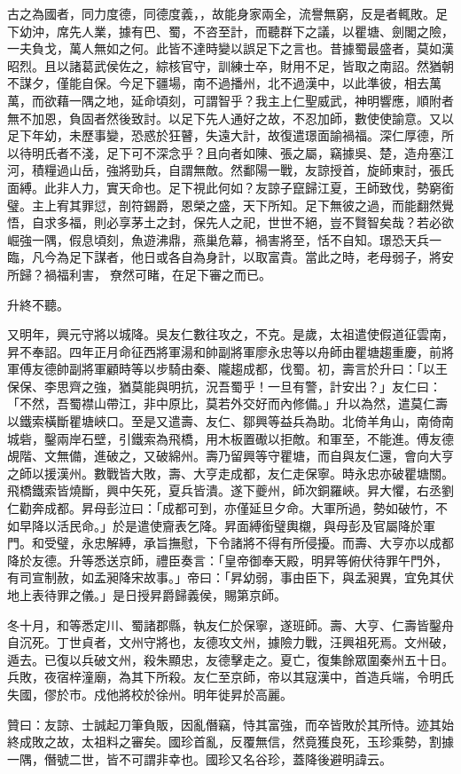 古之為國者，同力度德，同德度義，，故能身家兩全，流譽無窮，反是者輒敗。足下幼沖，席先人業，據有巴、蜀，不咨至計，而聽群下之議，以瞿塘、劍閣之險，一夫負戈，萬人無如之何。此皆不達時變以誤足下之言也。昔據蜀最盛者，莫如漢昭烈。且以諸葛武侯佐之，綜核官守，訓練士卒，財用不足，皆取之南詔。然猶朝不謀夕，僅能自保。今足下疆場，南不過播州，北不過漢中，以此準彼，相去萬萬，而欲藉一隅之地，延命頃刻，可謂智乎？我主上仁聖威武，神明響應，順附者無不加恩，負固者然後致討。以足下先人通好之故，不忍加師，數使使諭意。又以足下年幼，未歷事變，恐惑於狂瞽，失遠大計，故復遣璟面諭禍福。深仁厚德，所以待明氏者不淺，足下可不深念乎？且向者如陳、張之屬，竊據吳、楚，造舟塞江河，積糧過山岳，強將勁兵，自謂無敵。然鄱陽一戰，友諒授首，旋師東討，張氏面縛。此非人力，實天命也。足下視此何如？友諒子竄歸江夏，王師致伐，勢窮銜璧。主上宥其罪愆，剖符錫爵，恩榮之盛，天下所知。足下無彼之過，而能翻然覺悟，自求多福，則必享茅土之封，保先人之祀，世世不絕，豈不賢智矣哉？若必欲崛強一隅，假息頃刻，魚遊沸鼎，燕巢危幕，禍害將至，恬不自知。璟恐天兵一臨，凡今為足下謀者，他日或各自為身計，以取富貴。當此之時，老母弱子，將安所歸？禍福利害，尞然可睹，在足下審之而已。

升終不聽。

又明年，興元守將以城降。吳友仁數往攻之，不克。是歲，太祖遣使假道征雲南，昇不奉詔。四年正月命征西將軍湯和帥副將軍廖永忠等以舟師由瞿塘趨重慶，前將軍傅友德帥副將軍顧時等以步騎由秦、隴趨成都，伐蜀。初，壽言於升曰：「以王保保、李思齊之強，猶莫能與明抗，況吾蜀乎！一旦有警，計安出？」友仁曰：「不然，吾蜀襟山帶江，非中原比，莫若外交好而內修備。」升以為然，遣莫仁壽以鐵索橫斷瞿塘峽口。至是又遣壽、友仁、鄒興等益兵為助。北倚羊角山，南倚南城砦，鑿兩岸石壁，引鐵索為飛橋，用木板置礮以拒敵。和軍至，不能進。傅友德覘階、文無備，進破之，又破綿州。壽乃留興等守瞿塘，而自與友仁還，會向大亨之師以援漢州。數戰皆大敗，壽、大亨走成都，友仁走保寧。時永忠亦破瞿塘關。飛橋鐵索皆燒斷，興中矢死，夏兵皆潰。遂下夔州，師次銅羅峽。昇大懼，右丞劉仁勸奔成都。昇母彭泣曰：「成都可到，亦僅延旦夕命。大軍所過，勢如破竹，不如早降以活民命。」於是遣使齎表乞降。昇面縛銜璧輿櫬，與母彭及官屬降於軍門。和受璧，永忠解縛，承旨撫慰，下令諸將不得有所侵擾。而壽、大亨亦以成都降於友德。升等悉送京師，禮臣奏言：「皇帝御奉天殿，明昇等俯伏待罪午門外，有司宣制赦，如孟昶降宋故事。」帝曰：「昇幼弱，事由臣下，與孟昶異，宜免其伏地上表待罪之儀。」是日授昇爵歸義侯，賜第京師。

冬十月，和等悉定川、蜀諸郡縣，執友仁於保寧，遂班師。壽、大亨、仁壽皆鑿舟自沉死。丁世貞者，文州守將也，友德攻文州，據險力戰，汪興祖死焉。文州破，遁去。已復以兵破文州，殺朱顯忠，友德擊走之。夏亡，復集餘眾圍秦州五十日。兵敗，夜宿梓潼廟，為其下所殺。友仁至京師，帝以其寇漢中，首造兵端，令明氏失國，僇於市。戍他將校於徐州。明年徙昇於高麗。

贊曰：友諒、士誠起刀筆負販，因亂僭竊，恃其富強，而卒皆敗於其所恃。迹其始終成敗之故，太祖料之審矣。國珍首亂，反覆無信，然竟獲良死，玉珍乘勢，割據一隅，僭號二世，皆不可謂非幸也。國珍又名谷珍，蓋降後避明諱云。


